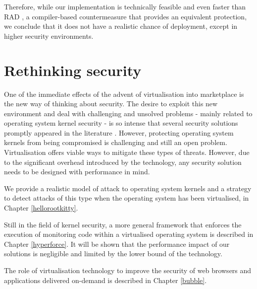 Therefore, while our implementation is technically feasible and even faster than RAD \cite{Chiueh:2001:RCT}, a compiler-based countermeasure that provides an equivalent protection, we conclude that it does not have a realistic chance of deployment, except in higher security environments. 













\section{Rethinking security} \label{rethinking}
One of the immediate effects of the advent of virtualisation into marketplace is the new way of thinking about security. The desire to exploit this new environment and deal with challenging and unsolved problems - mainly related to operating system kernel security - is so intense that several security solutions promptly appeared in the literature \cite{9, hvmharvard, NICKLE, dynamicdatakernel}.      
However, protecting operating system kernels from being compromised is challenging and still an open problem. 
Virtualisation offers viable ways to mitigate these types of threats. However, due to the significant overhead introduced by the technology, any security solution needs to be designed with performance in mind.

We provide a realistic model of attack to operating system kernels and a strategy to detect attacks of this type when the operating system has been virtualised, in Chapter \ref{hellorootkitty}. 

Still in the field of kernel security, a more general framework that enforces the execution of monitoring code within a virtualised operating system is described in Chapter \ref{hyperforce}. 
It will be shown that the performance impact of our solutions is negligible and limited by the lower bound of the technology.

The role of virtualisation technology to improve the security of web browsers and applications delivered on-demand is described in Chapter \ref{bubble}.
